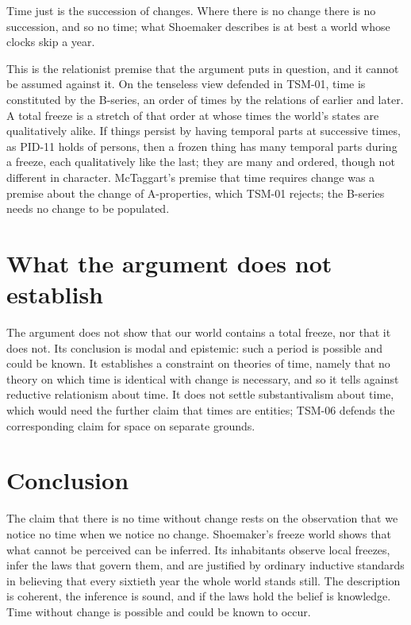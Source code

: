 \documentclass{situationist-preprint}
\begin{document}
\begin{objection}
Time just is the succession of changes. Where there is no change there is no succession, and so no time; what Shoemaker describes is at best a world whose clocks skip a year.
\end{objection}

\begin{reply}
This is the relationist premise that the argument puts in question, and it cannot be assumed against it. On the tenseless view defended in TSM-01, time is constituted by the B-series, an order of times by the relations of earlier and later. A total freeze is a stretch of that order at whose times the world's states are qualitatively alike. If things persist by having temporal parts at successive times, as PID-11 holds of persons, then a frozen thing has many temporal parts during a freeze, each qualitatively like the last; they are many and ordered, though not different in character. McTaggart's premise that time requires change was a premise about the change of A-properties, which TSM-01 rejects; the B-series needs no change to be populated.
\end{reply}

\section{What the argument does not establish}

The argument does not show that our world contains a total freeze, nor that it does not. Its conclusion is modal and epistemic: such a period is possible and could be known. It establishes a constraint on theories of time, namely that no theory on which time is identical with change is necessary, and so it tells against reductive relationism about time. It does not settle substantivalism about time, which would need the further claim that times are entities; TSM-06 defends the corresponding claim for space on separate grounds.

\section{Conclusion}

The claim that there is no time without change rests on the observation that we notice no time when we notice no change. Shoemaker's freeze world shows that what cannot be perceived can be inferred. Its inhabitants observe local freezes, infer the laws that govern them, and are justified by ordinary inductive standards in believing that every sixtieth year the whole world stands still. The description is coherent, the inference is sound, and if the laws hold the belief is knowledge. Time without change is possible and could be known to occur.
\end{document}
